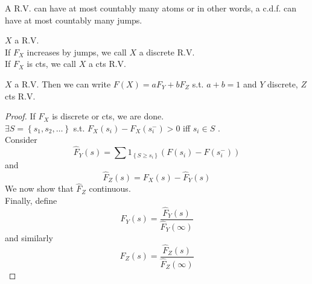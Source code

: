 \documentclass[../main.tex]{subfiles}
\begin{document}
\begin{lemma}
A R.V. can have at most countably many atoms or in other words,  a c.d.f. can have at most countably many jumps.
\end{lemma}
\begin{defn}
	$X$ a R.V.\\
	If $F_X$ increases by jumps, we call $X$  a discrete R.V.\\
	If $F_X$ is cts, we call $X$ a cts R.V.
\end{defn}
\begin{propo}
	$X$ a R.V. Then we can write $F( X) = aF_Y + b F_Z$ s.t. $a+b=1$ and $Y$ discrete, $Z$ cts R.V.
\end{propo}
\begin{proof}
If $F_X$ is discrete or cts, we are done.\\
$\exists S= \left\{ s_1,s_2, \ldots \right\}  $ s.t. $F_X( s_i) - F_X( s_i^{-}) >0$ iff $s_i \in S$ .\\
Consider
\[ 
	\hat{F}_Y( s) = \sum 1_{ \left\{ S \geq s_i \right\}  } ( F( s_i) -F( s_i^{-}) ) 
\]
and
\[ 
	\hat{F}_Z( s) = F_X( s) - \hat{F}_Y( s) 
\]
We now show that $ \hat{F}_Z$ continuous.\\
Finally, define
\[ 
	F_Y( s) = \frac{ \hat{F}_Y( s) }{ \hat{F}_Y( \infty ) }
\]
and similarly
\[ 
	F_Z( s) = \frac{\hat{F}_Z( s) }{\hat{F}_Z( \infty ) }
\]

\end{proof}
	
\end{document}
